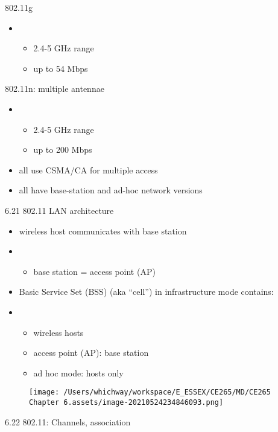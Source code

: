 \documentclass[
]{article}
\begin{document}
802.11g

\begin{itemize}
\item
  \begin{itemize}
  \item
    2.4-5 GHz range
  \item
    up to 54 Mbps
  \end{itemize}
\end{itemize}

802.11n: multiple antennae

\begin{itemize}
\item
  \begin{itemize}
  \item
    2.4-5 GHz range
  \item
    up to 200 Mbps
  \end{itemize}
\item
  all use CSMA/CA for multiple access
\item
  all have base-station and ad-hoc network versions
\end{itemize}

6.21 802.11 LAN architecture

\begin{itemize}
\item
  wireless host communicates with base station
\item
  \begin{itemize}
  \item
    base station = access point (AP)
  \end{itemize}
\item
  Basic Service Set (BSS) (aka ``cell'') in infrastructure mode
  contains:
\item
  \begin{itemize}
  \item
    wireless hosts
  \item
    access point (AP): base station
  \item
    ad hoc mode: hosts only
  \end{itemize}
\end{itemize}

\begin{figure}
\centering
\texttt{[image: /Users/whichway/workspace/E\_ESSEX/CE265/MD/CE265 Chapter 6.assets/image-20210524234846093.png]}
\caption{}
\end{figure}

6.22 802.11: Channels, association
\end{document}
